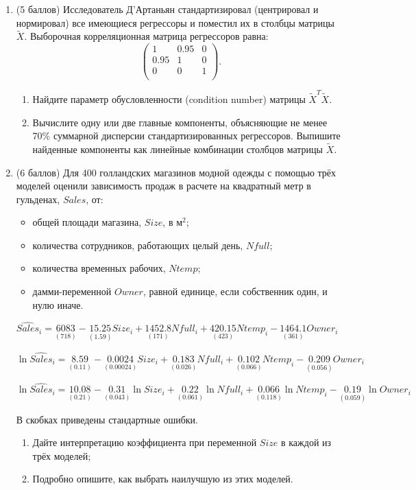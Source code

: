 \documentclass[12pt]{article}
\theoremstyle{definition}
\begin{document}
\begin{enumerate}
\item
(5 баллов)
Исследователь Д'Артаньян стандартизировал (центрировал и нормировал) все имеющиеся регрессоры и поместил их в столбцы матрицы $\tilde X$. Выборочная корреляционная матрица регрессоров равна:
\[
\begin{pmatrix}
1 & 0.95 & 0  \\
0.95 & 1 & 0  \\
0 & 0 & 1 \\
\end{pmatrix}.
\]
\begin{enumerate}
    \item Найдите параметр обусловленности (condition number) матрицы  $\tilde X^T \tilde X$.
    \item Вычислите одну или две главные компоненты, объясняющие не менее 70\% суммарной дисперсии стандартизированных регрессоров. Выпишите найденные компоненты как линейные комбинации столбцов матрицы $\tilde X$.
\end{enumerate}
\newpage

\item
(6 баллов)
Для 400 голландских магазинов модной одежды с помощью трёх моделей оценили зависимость продаж в расчете на квадратный метр в гульденах, $Sales$, от:
\begin{itemize}
\item общей площади магазина, $Size$, в м$^2$;
\item количества сотрудников, работающих целый день, $Nfull$;
\item количества временных рабочих, $Ntemp$;
\item дамми-переменной $Owner$, равной единице, если собственник один, и нулю иначе.
\end{itemize}

$\widehat{Sales}_i = \underset{(718)}{6083} - \underset{(1.59)}{15.25}Size_i + \underset{(171)}{1452.8} Nfull_i + \underset{(423)}{420.15} Ntemp_i - \underset{(361)}{1464.1} Owner_i$

$\ln \widehat{Sales}_i = \underset{(0.11)}{8.59} - \underset{(0.00024)}{0.0024}Size_i + \underset{(0.026)}{0.183} Nfull_i + \underset{(0.066)}{0.102} Ntemp_i - \underset{(0.056)}{0.209} Owner_i$

$\ln \widehat{Sales}_i = \underset{(0.21)}{10.08} - \underset{(0.043)}{0.31}\ln Size_i + \underset{(0.061)}{0.22} \ln Nfull_i + \underset{(0.118)}{0.066} \ln Ntemp_i - \underset{(0.059)}{0.19} \ln Owner_i$

В скобках приведены стандартные ошибки.

\begin{enumerate}
    \item Дайте интерпретацию коэффициента при переменной $Size$ в каждой из трёх моделей;
    \item Подробно опишите, как выбрать наилучшую из этих моделей.
\end{enumerate}

\end{enumerate}
\end{document}
